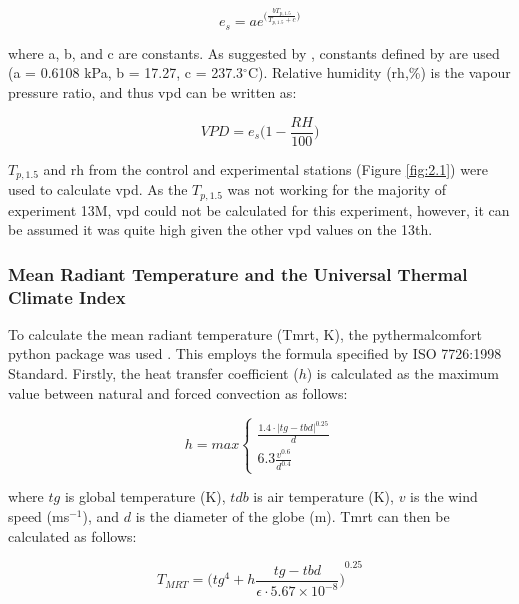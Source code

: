 \documentclass[final,3p,times,authoryear]{elsarticle}
\begin{document}
\begin{equation}
e_{s} = a e^{\bigg(  \frac{  bT_{p,1.5}   }{ T_{p,1.5} + c }    \bigg)}
\label{eq:7.7}
\end{equation}

where a, b, and c are constants. As suggested by \cite{McMahon2013}, constants defined by \cite{Allen1998} are used (a = 0.6108 kPa, b = 17.27, c = 237.3$^{\circ}$C). Relative humidity (\gls{rh},\%) is the vapour pressure ratio, and thus \gls{vpd} can be written as:

\begin{equation}
VPD=e_{s}\bigg( 1 - \frac{RH}{100} \bigg)
\label{eq:7.8}
\end{equation}

$T_{p,1.5}$ and \gls{rh} from the control and experimental stations (Figure \ref{fig:2.1}) were used to calculate \gls{vpd}. As the $T_{p,1.5}$ was not working for the majority of experiment 13M, \gls{vpd} could not be calculated for this experiment, however, it can be assumed it was quite high given the other \gls{vpd} values on the 13th.


\subsubsection{Mean Radiant Temperature and the Universal Thermal Climate Index}\label{sec:appendix7.4.4}

To calculate the mean radiant temperature (\gls{Tmrt}, K), the pythermalcomfort python package was used \citep{Tartarini2020}. This employs the formula specified by ISO 7726:1998 Standard. Firstly, the heat transfer coefficient ($h$) is calculated as the maximum value between natural and forced convection as follows:

\begin{equation}
h = max \begin{cases}  \frac{  1.4 \cdot |tg-tbd|^{0.25} }{d} \\  6.3 \frac{v^{0.6}}{d^{0.4}} \end{cases}
\label{eq:7.9}
\end{equation}

where $tg$ is global temperature (K), $tdb$ is air temperature (K), $v$ is the wind speed (ms$^{-1}$), and $d$ is the diameter of the globe (m). \gls{Tmrt} can then be calculated as follows:

\begin{equation}
T_{MRT}=  {  \bigg( tg^{4} + h \frac{tg - tbd}{\epsilon \cdot 5.67\times 10^{-8}} \bigg)}^{0.25}
\label{eq:7.10}
\end{equation}
\end{document}
